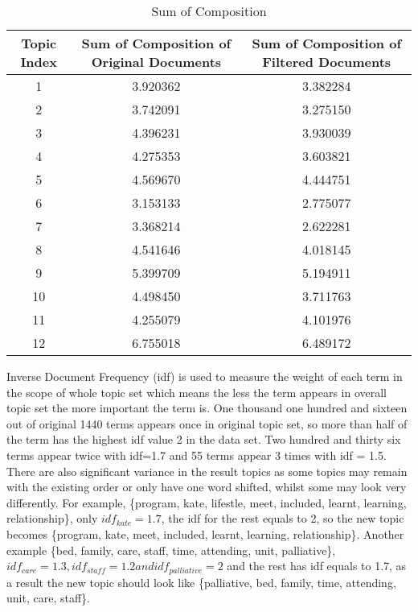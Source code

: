 \documentclass[11pt,twoside]{report}
\begin{document}
\begin{table}[h]
\caption{Sum of Composition}
\centering
\begin{tabular}{c c c}
\hline\hline
Topic Index & Sum of Composition of Original Documents & Sum of Composition of Filtered Documents\\
\hline
1 & 3.920362 & 3.382284\\
2 & 3.742091 & 3.275150\\
3 & 4.396231 & 3.930039\\
4 & 4.275353 & 3.603821\\
5 & 4.569670 & 4.444751\\
6 & 3.153133 & 2.775077\\
7 & 3.368214 & 2.622281\\
8 & 4.541646 & 4.018145\\
9 & 5.399709 & 5.194911\\
10 & 4.498450 & 3.711763\\
11 & 4.255079 & 4.101976\\
12 & 6.755018 & 6.489172\\
\hline
\end{tabular}
\label{table:SumComposition}
\end{table}

Inverse Document Frequency (idf) is used to measure the weight of each term in the scope of whole topic set which means the less the term appears in overall topic set the more important the term is. One thousand one hundred and sixteen out of original 1440 terms appears once in original topic set, so more than half of the term has the highest idf value 2 in the data set. Two hundred and thirty six terms appear twice with idf=1.7 and 55 terms appear 3 times with idf = 1.5. There are also significant variance in the result topics as some topics may remain with the existing order or only have one word shifted, whilst some may look very differently. For example, \{program, kate, lifestle, meet, included, learnt, learning, relationship\}, only $idf_{kate} = 1.7$, the idf for the rest equals to 2, so the new topic becomes \{program, kate, meet, included, learnt, learning, relationship\}. Another example \{bed, family, care, staff, time, attending, unit, palliative\}, $idf_{care}=1.3, idf_{staff}=1.2 and idf_{palliative}=2$ and the rest has idf equals to 1.7, as a result the new topic should look like \{palliative, bed, family, time, attending, unit, care, staff\}. 
\end{document}
